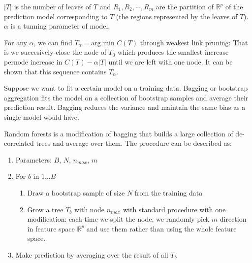 \documentclass{article}
\begin{document}
$|T|$ is the number of leaves of $T$ and $R_1, R_2,\cdots, R_m$ are the partition of $\mathbb{R}^p$ of the prediction model corresponding to $T$ (the regions represented by the leaves of $T$). $\alpha$ is a tunning parameter of model. 

For any $\alpha$, we can find $T_\alpha=\textrm{arg min }C(T)$ through weakest link pruning: That is we succesively close the node of $T_0$ which produces the smallest increase pernode increase in $C(T)-\alpha|T|$ until we are left with one node. It can be shown that this sequence contains $T_\alpha$.

Suppose we want to fit a certain model on a training data. Bagging or bootstrap aggregation fits the model on a collection of bootstrap samples and average their prediction result. Bagging reduces the variance and maintain the same bias as a single model would have.

Random forests is a modification of bagging that builds a large collection of de-correlated trees and average over them. The procedure can be described as:

\begin{enumerate}
\item
Parameters: $B$, $N$, $n_{max}$, $m$
\item
For $b$ in $1\dots B$
\begin{enumerate}
\item
Draw a bootstrap sample of size $N$ from the training data
\item
Grow a tree $T_b$ with node $n_{max}$ with standard procedure with one modification: each time we split the node, we randomly pick $m$ direction in feature space $\mathbb{R}^p$ and use them rather than using the whole feature space. 
\end{enumerate}
\item
Make prediction by averaging over the result of all $T_b$
\end{enumerate}
\end{document}
